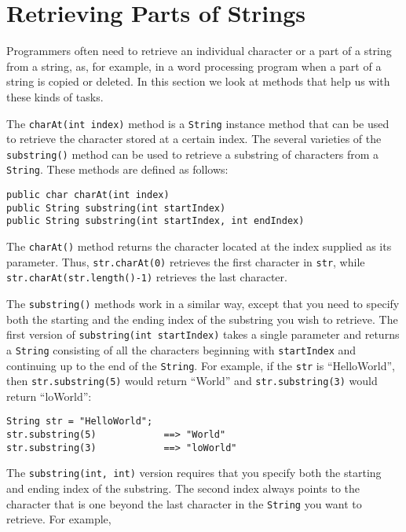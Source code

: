 \section{Retrieving Parts of Strings}
\label{retrieving-partsof-strings}
\noindent Programmers often need to retrieve an individual character or
a part of a string from a string, as, for example, in a word
processing program when a part of a string is copied or deleted. In
this section we look at methods that help us with these kinds of tasks.

The {\tt charAt(int index)} method is a {\tt String} instance method
that can be used to retrieve the character stored at a certain
index.  The several varieties of the {\tt substring()} method can be
used to retrieve a substring of characters from a {\tt String}. These
methods are defined as follows:

\begin{jjjlisting}
\begin{lstlisting}
public char charAt(int index)
public String substring(int startIndex)
public String substring(int startIndex, int endIndex)
\end{lstlisting}
\end{jjjlisting}

\noindent The {\tt charAt()} method
returns the character located at the index supplied as its parameter.
Thus, {\tt str.charAt(0)} retrieves the first character in {\tt str},
while {\tt str.charAt(str.length()-1)} retrieves the last character.

The {\tt substring()} methods work in a
similar way, except that you need to specify both the starting and the
ending index of the substring you wish to retrieve.  The first version
of {\tt substring(int startIndex)} takes a single parameter and
returns a {\tt String} consisting of all the characters beginning with
{\tt startIndex} and continuing up to the end of the {\tt String}. For
example, if the {\tt str} is ``HelloWorld'', then {\tt str.substring(5)}
would return ``World'' and {\tt str.substring(3)} would return
``loWorld'':

\begin{jjjlisting}
\begin{lstlisting}
String str = "HelloWorld";
str.substring(5)            ==> "World"
str.substring(3)            ==> "loWorld"
\end{lstlisting}
\end{jjjlisting}

\noindent The {\tt substring(int, int)} version requires that you specify both
the starting and ending index of the substring.   The second
index always points to the character that is one beyond the last
character in the {\tt String} you want to retrieve.  For example,

